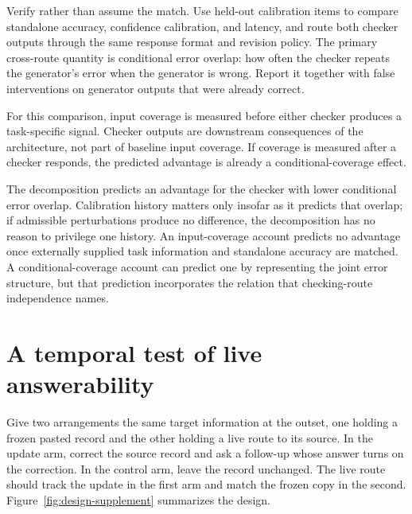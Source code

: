 \documentclass[12pt]{article}
\begin{document}
Verify rather than assume the match. Use held-out calibration items to compare standalone
accuracy, confidence calibration, and latency, and route both checker outputs through the
same response format and revision policy. The primary cross-route quantity is conditional
error overlap: how often the checker repeats the generator's error when the generator is
wrong. Report it together with false interventions on generator outputs that were already
correct.

For this comparison, input coverage is measured before either checker produces a
task-specific signal. Checker outputs are downstream consequences of the architecture,
not part of baseline input coverage. If coverage is measured after a checker responds, the
predicted advantage is already a conditional-coverage effect.

The decomposition predicts an advantage for the checker with lower conditional error overlap.
Calibration history matters only insofar as it predicts that overlap; if admissible
perturbations produce no difference, the decomposition has no reason to privilege one history.
An input-coverage account predicts no advantage once externally supplied task information
and standalone accuracy are matched. A conditional-coverage account can predict one by
representing the joint error structure, but that prediction incorporates the relation that
checking-route independence names.

\section{A temporal test of live answerability}

Give two arrangements the same target information at the outset, one holding a frozen
pasted record and the other holding a live route to its source. In the update arm, correct
the source record and ask a follow-up whose answer turns on the correction. In the control
arm, leave the record unchanged. The live route should track the update in the first arm
and match the frozen copy in the second. Figure~\ref{fig:design-supplement} summarizes the
design.
\end{document}
